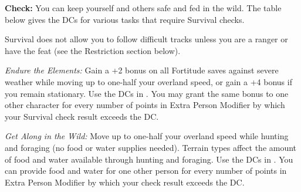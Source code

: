 \textbf{Check:} You can keep yourself and others safe and fed in the wild. The table below gives the DCs for various tasks that require Survival checks.

Survival does not allow you to follow difficult tracks unless you are a ranger or have the  feat (see the Restriction section below).


\textit{Endure the Elements:} Gain a +2 bonus on all Fortitude saves against severe weather while moving up to one-half your overland speed, or gain a +4 bonus if you remain stationary. Use the DCs in . You may grant the same bonus to one other character for every number of points in Extra Person Modifier by which your Survival check result exceeds the DC.


\textit{Get Along in the Wild:} Move up to one-half your overland speed while hunting and foraging (no food or water supplies needed). Terrain types affect the amount of food and water available through hunting and foraging. Use the DCs in . You can provide food and water for one other person for every number of points in Extra Person Modifier by which your check result exceeds the DC.

